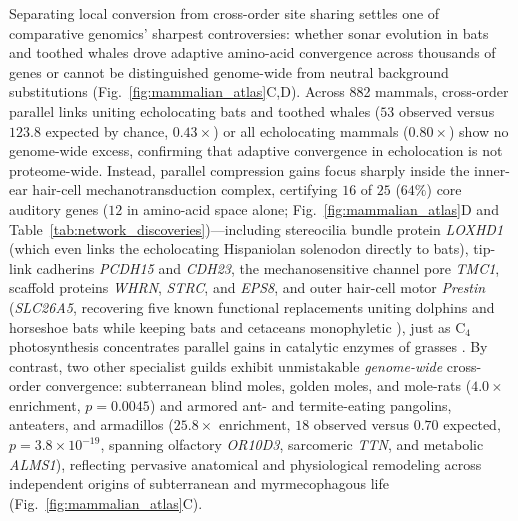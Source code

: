 \documentclass[11pt,a4paper]{article}
\begin{document}
Separating local conversion from cross-order site sharing settles one of comparative genomics' sharpest controversies: whether sonar evolution in bats and toothed whales drove adaptive amino-acid convergence across thousands of genes \citep{parker2013genome} or cannot be distinguished genome-wide from neutral background substitutions \citep{zou2015no,thomas2015molecular} (Fig.~\ref{fig:mammalian_atlas}C,D). Across 882 mammals, cross-order parallel links uniting echolocating bats and toothed whales ($53$ observed versus $123.8$ expected by chance, $0.43\times$) or all echolocating mammals ($0.80\times$) show no genome-wide excess, confirming that adaptive convergence in echolocation is not proteome-wide. Instead, parallel compression gains focus sharply inside the inner-ear hair-cell mechanotransduction complex, certifying $16$ of $25$ ($64\%$) core auditory genes ($12$ in amino-acid space alone; Fig.~\ref{fig:mammalian_atlas}D and Table~\ref{tab:network_discoveries})---including stereocilia bundle protein \textit{LOXHD1} (which even links the echolocating Hispaniolan solenodon directly to bats), tip-link cadherins \textit{PCDH15} and \textit{CDH23}, the mechanosensitive channel pore \textit{TMC1}, scaffold proteins \textit{WHRN}, \textit{STRC}, and \textit{EPS8}, and outer hair-cell motor \textit{Prestin} (\textit{SLC26A5}, recovering five known functional replacements uniting dolphins and horseshoe bats while keeping bats and cetaceans monophyletic \citep{liu2010convergent,li2010hearing}), just as $\text{C}_4$ photosynthesis concentrates parallel gains in catalytic enzymes of grasses \citep{christin2012adaptive}. By contrast, two other specialist guilds exhibit unmistakable \emph{genome-wide} cross-order convergence: subterranean blind moles, golden moles, and mole-rats ($4.0\times$ enrichment, $p = 0.0045$) and armored ant- and termite-eating pangolins, anteaters, and armadillos ($25.8\times$ enrichment, $18$ observed versus $0.70$ expected, $p = 3.8 \times 10^{-19}$, spanning olfactory \textit{OR10D3}, sarcomeric \textit{TTN}, and metabolic \textit{ALMS1}), reflecting pervasive anatomical and physiological remodeling across independent origins of subterranean and myrmecophagous life (Fig.~\ref{fig:mammalian_atlas}C).
\end{document}

